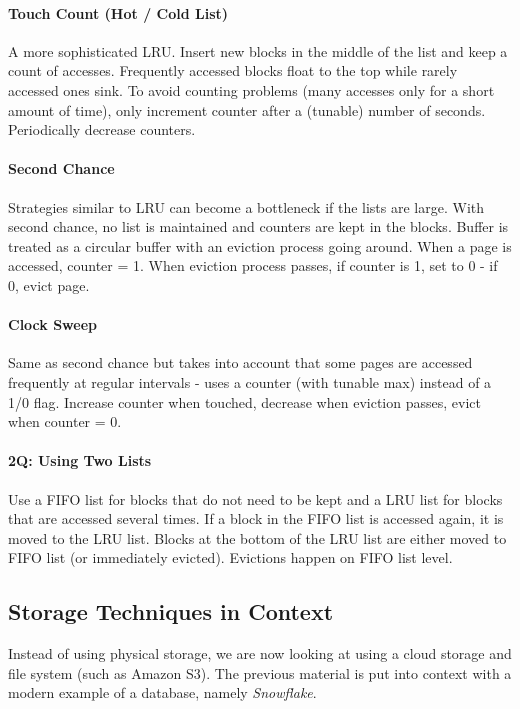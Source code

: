 
\paragraph{Touch Count (Hot / Cold List)}
A more sophisticated LRU. Insert new blocks in the middle of the list and keep a count of accesses. Frequently accessed blocks float to the top while rarely accessed ones sink. To avoid counting problems (many accesses only for a short amount of time), only increment counter after a (tunable) number of seconds. Periodically decrease counters.

\paragraph{Second Chance}
Strategies similar to LRU can become a bottleneck if the lists are large. With second chance, no list is maintained and counters are kept in the blocks. Buffer is treated as a circular buffer with an eviction process going around. When a page is accessed, counter = 1. When eviction process passes, if counter is 1, set to 0 - if 0, evict page.

\paragraph{Clock Sweep}
Same as second chance but takes into account that some pages are accessed frequently at regular intervals - uses a counter (with tunable max) instead of a 1/0 flag. Increase counter when touched, decrease when eviction passes, evict when counter = 0.

\paragraph{2Q: Using Two Lists}
Use a FIFO list for blocks that do not need to be kept and a LRU list for blocks that are accessed several times. If a block in the FIFO list is accessed again, it is moved to the LRU list. Blocks at the bottom of the LRU list are either moved to FIFO list (or immediately evicted). Evictions happen on FIFO list level.



\subsection{Storage Techniques in Context}

Instead of using physical storage, we are now looking at using a cloud storage and file system (such as Amazon S3). The previous material is put into context with a modern example of a database, namely \textit{Snowflake}.

